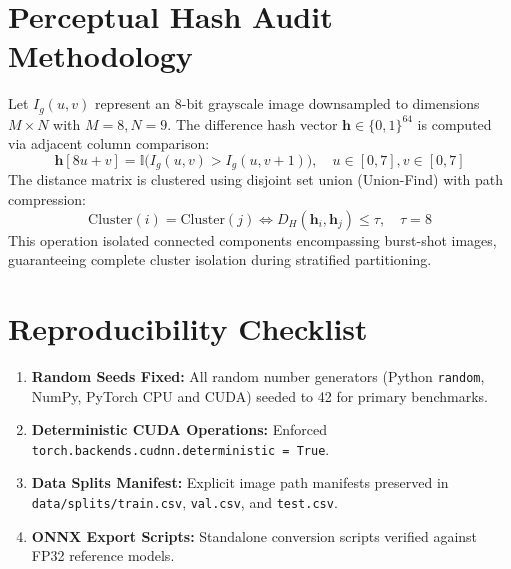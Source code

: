 \documentclass[journal]{IEEEtran}
\begin{document}
\section{Perceptual Hash Audit Methodology}
Let $I_g(u, v)$ represent an 8-bit grayscale image downsampled to dimensions $M \times N$ with $M = 8, N = 9$. The difference hash vector $\mathbf{h} \in \{0, 1\}^{64}$ is computed via adjacent column comparison:
\begin{equation}
    \mathbf{h}[8u + v] = \mathbb{I}\Big( I_g(u, v) > I_g(u, v+1) \Big), \quad u \in [0, 7], v \in [0, 7]
\end{equation}
The distance matrix is clustered using disjoint set union (Union-Find) with path compression:
\begin{equation}
    \text{Cluster}(i) = \text{Cluster}(j) \iff D_H(\mathbf{h}_i, \mathbf{h}_j) \le \tau, \quad \tau = 8
\end{equation}
This operation isolated \nearDupGroups{} connected components encompassing \nearDupImages{} burst-shot images, guaranteeing complete cluster isolation during stratified partitioning.

\section{Reproducibility Checklist}
\begin{enumerate}
    \item \textbf{Random Seeds Fixed:} All random number generators (Python \texttt{random}, NumPy, PyTorch CPU and CUDA) seeded to 42 for primary benchmarks.
    \item \textbf{Deterministic CUDA Operations:} Enforced \texttt{torch.backends.cudnn.deterministic = True}.
    \item \textbf{Data Splits Manifest:} Explicit image path manifests preserved in \texttt{data/splits/train.csv}, \texttt{val.csv}, and \texttt{test.csv}.
    \item \textbf{ONNX Export Scripts:} Standalone conversion scripts verified against FP32 reference models.
\end{enumerate}



\end{document}
